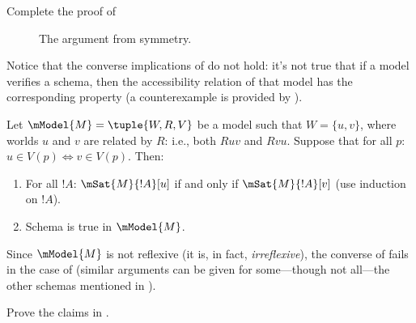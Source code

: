 \documentclass[../../../include/open-logic-section]{subfiles}
\begin{document}
\begin{prob}
  Complete the proof of 
\end{prob}

\begin{figure}
  \begin{center}
  \end{center}
\caption{The argument from symmetry.}
\end{figure}

Notice that the converse implications of  do
not hold: it's not true that if a model verifies a schema, then the
accessibility relation of that model has the corresponding property (a
counterexample is provided by ).

\begin{ex}
  Let $\mModel{M} = \tuple{W, R, V}$ be a model such that $W = \{u, v
  \}$, where worlds $u$ and $v$ are related by $R$: i.e., both $Ruv$
  and $Rvu$.  Suppose that for all $p$: $u \in V(p) \Leftrightarrow v
  \in V(p)$. Then:
  \begin{enumerate}
  \item For all $!A$: $\mSat{M}{!A}[u]$ if and only if
    $\mSat{M}{!A}[v]$ (use induction on $!A$).
  \item Schema  is true in $\mModel{M}$.
  \end{enumerate}
  Since $\mModel{M}$ is not reflexive (it is, in fact,
  \emph{irreflexive}), the converse of 
  fails in the case of  (similar arguments can be given for
  some---though not all---the other schemas mentioned in
  ).
\end{ex}

\begin{prob}
  Prove the claims in .
\end{prob}
\end{document}
